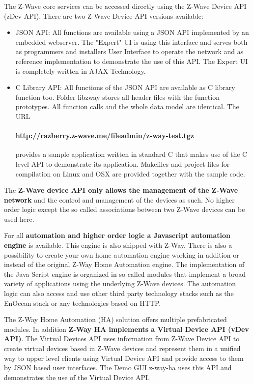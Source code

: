 The Z-Wave core services can be accessed directly using the Z-Wave Device API (zDev API). There are two
Z-Wave Device API versions available:
\begin{itemize}
\item JSON API: All functions are available using a JSON API implemented by an 
embedded webserver. The "Expert" UI is using this interface and serves both as programmers 
and installers User Interface to operate the network and as reference implementation to demonstrate the use of this 
API. The Expert UI is completely written in AJAX Technology.
\item C Library API: All functions of the JSON API are available as C library 
function too. Folder libzway stores all header files with the function 
prototypes. All function calls and the whole data model are identical. The URL

\paragraph{http://razberry.z-wave.me/fileadmin/z-way-test.tgz}

provides a sample application written in standard C that makes use of the C level API to 
demonstrate its application. Makefiles and project files for compilation on Linux and 
OSX are provided together with the sample code.


\end{itemize}

The \textbf{Z-Wave device API only allows the management of the Z-Wave network} and the control
and management of the devices as such. No higher order logic except the so called associations
between two Z-Wave devices can be used here.

For all \textbf{automation and higher order logic a Javascript automation engine} is available.
This engine is also shipped with Z-Way. There is also a possibility to create your own home automation engine
working in addition or instead  of the original Z-Way Home Automation engine. 
The implementation of the Java Script engine is organized in so called modules that implement 
a broad variety of applications using the underlying Z-Wave devices. The automation logic 
can also access and use other third party technology stacks such as the EnOcean stack
or any technologies based on HTTP.

The Z-Way Home Automation (HA) solution offers multiple prefabricated modules.
In addition \textbf{Z-Way HA implements
a Virtual Device API (vDev API)}. The Virtual Devices API uses information
from Z-Wave Device API to create virtual devices based in Z-Wave devices and
represent them in a unified way to upper level clients using Virtual Device API
and provide access to them by JSON based user interfaces.
The Demo GUI z-way-ha uses this API and demonstrates the use of the Virtual Device API.


